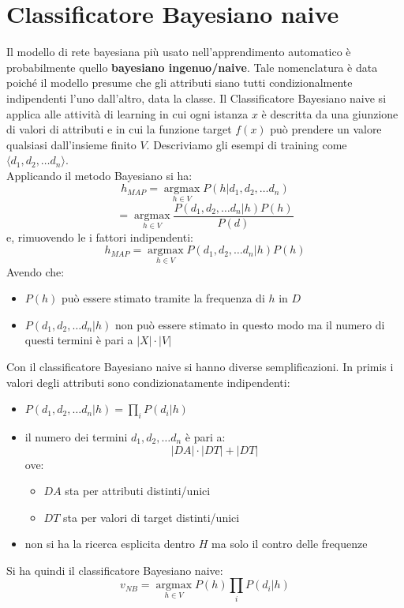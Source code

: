 \section{Classificatore Bayesiano naive}
Il modello di rete bayesiana più usato nell'apprendimento automatico è probabilmente quello  \textbf{bayesiano ingenuo/naive}. Tale nomenclatura è data poiché il modello presume che gli attributi siano tutti condizionalmente indipendenti l'uno dall'altro, data la classe.
Il Classificatore Bayesiano naive si applica alle attività di learning in
cui ogni istanza $x$ è descritta da una giunzione di valori di attributi e in
cui la funzione target $f(x)$ può prendere un valore qualsiasi dall'insieme
finito $V$. Descriviamo gli esempi di training come $\langle d_1, d_2,\ldots
d_n\rangle $. \\
Applicando il metodo Bayesiano si ha:
\[h_{MAP}=\operatorname*{argmax}_{h\in V}P(h|d_1, d_2,\ldots d_n)\]
\[=\operatorname*{argmax}_{h\in V}\frac{P(d_1, d_2,\ldots d_n|h)P(h)}{P(d)}\]
e, rimuovendo le i fattori indipendenti:
\[h_{MAP}=\operatorname*{argmax}_{h\in V}P(d_1, d_2,\ldots d_n|h)P(h)\]
Avendo che:
\begin{itemize}
  \item $P(h)$ può essere stimato tramite la frequenza di $h$ in $D$
  \item $P(d_1, d_2,\ldots d_n|h)$ non può essere stimato in questo modo ma il
  numero di questi termini è pari a $|X|\cdot |V|$
\end{itemize}
Con il classificatore Bayesiano naive si hanno diverse semplificazioni. In primis
i valori degli attributi sono condizionatamente indipendenti:
\begin{itemize}
  \item $P(d_1, d_2,\ldots d_n|h)=\prod_iP(d_i|h)$
  \item il numero dei termini $d_1, d_2,\ldots d_n$ è pari a:
  \[|DA|\cdot |DT|+|DT|\]
  ove:
  \begin{itemize}
    \item $DA$ sta per attributi distinti/unici
    \item $DT$ sta per valori di target distinti/unici
  \end{itemize}
  \item non si ha la ricerca esplicita dentro $H$ ma solo il contro delle
  frequenze 
\end{itemize}
Si ha quindi il classificatore Bayesiano naive:
\[v_{NB}=\operatorname*{argmax}_{h\in V}P(h)\prod_iP(d_i|h)\]
\newpage
